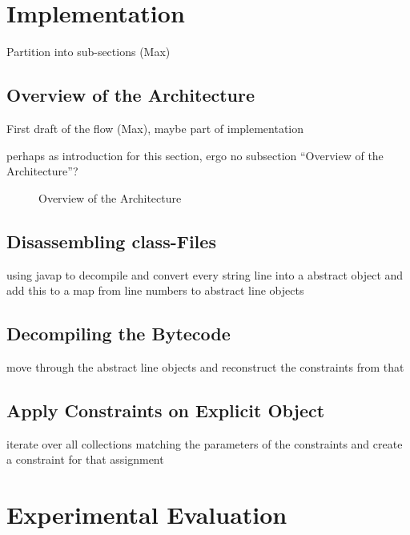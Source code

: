 \documentclass[conference]{IEEEtran}
\begin{document}
\section{Implementation}
\label{sec:implementation}

\danger Partition into sub-sections (Max)

\subsection{Overview of the Architecture}
\label{sec:impl_overv-arch}

\danger First draft of the flow (Max), maybe part of implementation

\danger perhaps as introduction for this section, ergo no subsection ``Overview
of the Architecture''?

\begin{figure*}
  \centering
  \label{fig:architecture}
  \tikzarchitecture
  \caption{Overview of the Architecture}
\end{figure*}

\subsection{Disassembling class-Files}
\label{sec:impl_disassembling}

\danger using javap to decompile and convert every string line into a abstract
object and add this to a map from line numbers to abstract line objects

\subsection{Decompiling the Bytecode}
\label{sec:impl_decompiling}

\danger move through the abstract line objects and reconstruct the constraints
from that

\subsection{Apply Constraints on Explicit Object}
\label{sec:impl_applying}

\danger iterate over all collections matching the parameters of the constraints
and create a constraint for that assignment

\section{Experimental Evaluation}
\label{sec:exper-eval}
\end{document}
